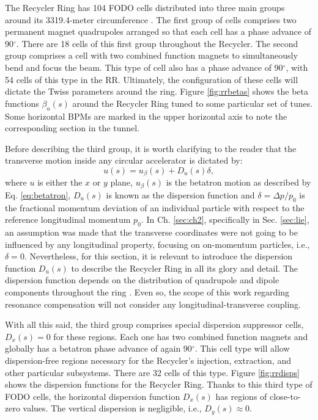 The Recycler Ring has 104 FODO cells distributed into three main groups around its 3319.4-meter circumference \cite{rr0}. The first group of cells comprises two permanent magnet quadrupoles arranged so that each cell has a phase advance of 90$^{\circ}$. There are 18 cells of this first group throughout the Recycler. The second group comprises a cell with two combined function magnets to simultaneously bend and focus the beam. This type of cell also has a phase advance of 90$^{\circ}$, with 54 cells of this type in the RR. Ultimately, the configuration of these cells will dictate the Twiss parameters around the ring. Figure \ref{fig:rrbetas} shows the beta functions $\beta_u(s)$ around the Recycler Ring tuned to some particular set of tunes. Some horizontal BPMs are marked in the upper horizontal axis to note the corresponding section in the tunnel.    

Before describing the third group, it is worth clarifying to the reader that the transverse motion inside any circular accelerator is dictated by:
\begin{equation}
   \label{eq:utotal}
   u(s) = u_{\beta}(s) + D_u(s) \delta,
\end{equation}
where $u$ is either the $x$ or $y$ plane, $u_{\beta}(s)$ is the betatron motion as described by Eq. \ref{eq:betatron}, $D_u(s)$ is known as the dispersion function and $\delta=\Delta p/p_0$ is the fractional momentum deviation of an individual particle with respect to the reference longitudinal momentum $p_0$. In Ch. \ref{sec:ch2}, specifically in Sec. \ref{sec:lie}, an assumption was made that the transverse coordinates were not going to be influenced by any longitudinal property, focusing on on-momentum particles, i.e., $\delta =0$. Nevertheless, for this section, it is relevant to introduce the dispersion function $D_u(s)$ to describe the Recycler Ring in all its glory and detail. The dispersion function depends on the distribution of quadrupole and dipole components throughout the ring \cite{sylee}. Even so, the scope of this work regarding resonance compensation will not consider any longitudinal-transverse coupling.   

With all this said, the third group comprises special dispersion suppressor cells, $D_x(s)=0$ for these regions. Each one has two combined function magnets and globally has a betatron phase advance of again 90$^{\circ}$. This cell type will allow dispersion-free regions necessary for the Recycler's injection, extraction, and other particular subsystems. There are 32 cells of this type. Figure \ref{fig:rrdisps} shows the dispersion functions for the Recycler Ring. Thanks to this third type of FODO cells, the horizontal dispersion function $D_x(s)$ has regions of close-to-zero values. The vertical dispersion is negligible, i.e., $D_y(s)\approx 0$.

